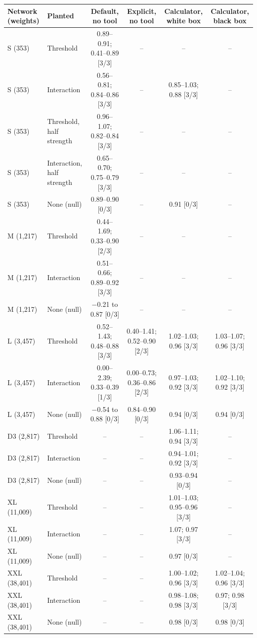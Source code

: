 \begin{tabular}{llcccc}
\toprule
Network (weights) & Planted & Default, no tool & Explicit, no tool & Calculator, white box & Calculator, black box \\
\midrule
S (353) & Threshold & 0.89--0.91; 0.41--0.89 [3/3] & -- & -- & -- \\
S (353) & Interaction & 0.56--0.81; 0.84--0.86 [3/3] & -- & 0.85--1.03; 0.88 [3/3] & -- \\
S (353) & Threshold, half strength & 0.96--1.07; 0.82--0.84 [3/3] & -- & -- & -- \\
S (353) & Interaction, half strength & 0.65--0.70; 0.75--0.79 [3/3] & -- & -- & -- \\
S (353) & None (null) & 0.89--0.90 [0/3] & -- & 0.91 [0/3] & -- \\
\addlinespace
M (1,217) & Threshold & 0.44--1.69; 0.33--0.90 [2/3] & -- & -- & -- \\
M (1,217) & Interaction & 0.51--0.66; 0.89--0.92 [3/3] & -- & -- & -- \\
M (1,217) & None (null) & $-$0.21 to 0.87 [0/3] & -- & -- & -- \\
\addlinespace
L (3,457) & Threshold & 0.52--1.43; 0.48--0.88 [3/3] & 0.40--1.41; 0.52--0.90 [2/3] & 1.02--1.03; 0.96 [3/3] & 1.03--1.07; 0.96 [3/3] \\
L (3,457) & Interaction & 0.00--2.39; 0.33--0.39 [1/3] & 0.00--0.73; 0.36--0.86 [2/3] & 0.97--1.03; 0.92 [3/3] & 1.02--1.10; 0.92 [3/3] \\
L (3,457) & None (null) & $-$0.54 to 0.88 [0/3] & 0.84--0.90 [0/3] & 0.94 [0/3] & 0.94 [0/3] \\
\addlinespace
D3 (2,817) & Threshold & -- & -- & 1.06--1.11; 0.94 [3/3] & -- \\
D3 (2,817) & Interaction & -- & -- & 0.94--1.01; 0.92 [3/3] & -- \\
D3 (2,817) & None (null) & -- & -- & 0.93--0.94 [0/3] & -- \\
\addlinespace
XL (11,009) & Threshold & -- & -- & 1.01--1.03; 0.95--0.96 [3/3] & -- \\
XL (11,009) & Interaction & -- & -- & 1.07; 0.97 [3/3] & -- \\
XL (11,009) & None (null) & -- & -- & 0.97 [0/3] & -- \\
\addlinespace
XXL (38,401) & Threshold & -- & -- & 1.00--1.02; 0.96 [3/3] & 1.02--1.04; 0.96 [3/3] \\
XXL (38,401) & Interaction & -- & -- & 0.98--1.08; 0.98 [3/3] & 0.97; 0.98 [3/3] \\
XXL (38,401) & None (null) & -- & -- & 0.98 [0/3] & 0.98 [0/3] \\
\bottomrule
\end{tabular}
